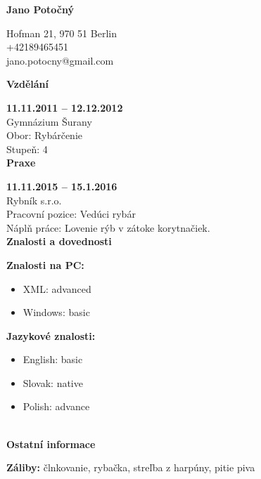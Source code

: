 \documentclass[12pt, a4paper]{article}
\begin{document}
        \begin{center} \huge \bfseries Jano Potočný\end{center}
Hofman 21, 970 51 Berlin\\
+42189465451\\
jano.potocny@gmail.com\\

{\hrulefill \large \bfseries Vzdělání\hrulefill}

\vspace{0.2cm}
{\bfseries 11.11.2011 -- 12.12.2012}\\Gymnázium Šurany\\Obor: Rybárčenie\\Stupeň: 4\\

{\hrulefill \large \bfseries Praxe\hrulefill}

\vspace{0.2cm}
{\bfseries 11.11.2015 -- 15.1.2016}\\Rybník s.r.o.\\ Pracovní pozice: Vedúci rybár\\ Náplň práce: Lovenie rýb v zátoke korytnačiek.\\

{\hrulefill \large \bfseries Znalosti a dovednosti\hrulefill}

\vspace{0.2cm}\begin{minipage}[t]{6cm}{\bfseries Znalosti na PC:}
    \begin{itemize}[leftmargin=0.5cm,topsep=0cm]
    \setlength\itemsep{-0.2cm}\item XML: advanced\item Windows: basic\end{itemize}\end{minipage}\begin{minipage}[t]{6cm}{\bfseries Jazykové znalosti:}
    \begin{itemize}[leftmargin=0.5cm,topsep=0cm]
    \setlength\itemsep{-0.2cm}\item English: basic\item Slovak: native\item Polish: advance\end{itemize}\end{minipage} \\

{\hrulefill \large \bfseries Ostatní informace\hrulefill}

\vspace{0.2cm}
{\bfseries Záliby:} člnkovanie, rybačka, streľba z harpúny, pitie piva
\end{document}
